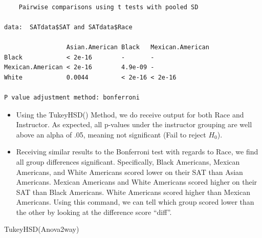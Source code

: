 \documentclass[
  letterpaper,
  DIV=11,
  numbers=noendperiod]{scrreprt}
\newenvironment{Shaded}{\begin{snugshade}}{\end{snugshade}}
\newcommand{\AttributeTok}[1]{\textcolor[rgb]{0.40,0.45,0.13}{#1}}
\newcommand{\FunctionTok}[1]{\textcolor[rgb]{0.28,0.35,0.67}{#1}}
\newcommand{\NormalTok}[1]{\textcolor[rgb]{0.00,0.23,0.31}{#1}}
\newcommand{\SpecialCharTok}[1]{\textcolor[rgb]{0.37,0.37,0.37}{#1}}
\newcommand{\StringTok}[1]{\textcolor[rgb]{0.13,0.47,0.30}{#1}}
\providecommand{\tightlist}{%
  \setlength{\itemsep}{0pt}\setlength{\parskip}{0pt}}\usepackage{longtable,booktabs,array}
\begin{document}
\begin{Shaded}
\end{Shaded}

\begin{verbatim}

    Pairwise comparisons using t tests with pooled SD 

data:  SATdata$SAT and SATdata$Race 

                 Asian.American Black   Mexican.American
Black            < 2e-16        -       -               
Mexican.American < 2e-16        4.9e-09 -               
White            0.0044         < 2e-16 < 2e-16         

P value adjustment method: bonferroni 
\end{verbatim}

\begin{itemize}
\tightlist
\item
  Using the TukeyHSD() Method, we do receive output for both Race and
  Instructor. As expected, all p-values under the instructor grouping
  are well above an alpha of .05, meaning not significant (Fail to
  reject \(H_0\)).
\item
  Receiving similar results to the Bonferroni test with regards to Race,
  we find all group differences significant. Specifically, Black
  Americans, Mexican Americans, and White Americans scored lower on
  their SAT than Asian Americans. Mexican Americans and White Americans
  scored higher on their SAT than Black Americans. White Americans
  scored higher than Mexican Americans. Using this command, we can tell
  which group scored lower than the other by looking at the difference
  score ``diff''.
\end{itemize}

\begin{Shaded}
\begin{Highlighting}[]
\FunctionTok{TukeyHSD}\NormalTok{(Anova2way)}
\end{Highlighting}
\end{Shaded}
\end{document}
